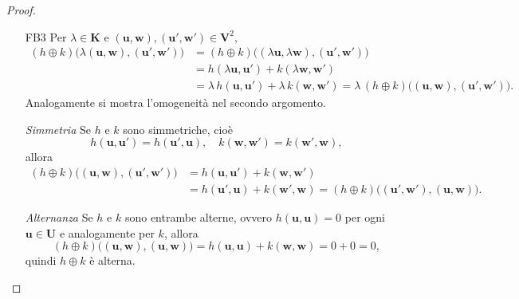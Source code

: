 \documentclass{article}
\theoremstyle{plain}
\theoremstyle{definition}
\theoremstyle{remark}
\begin{document}
\begin{proof}
\begin{itemize}
        \item[FB3]  Per \(\lambda\in \mathbf{K}\) e \((\mathbf{u},\mathbf{w}),(\mathbf{u}',\mathbf{w}')\in \mathbf{V}^2\),
        \[
        \begin{aligned}
        (h\oplus k)\bigl(\lambda(\mathbf{u},\mathbf{w}),(\mathbf{u}',\mathbf{w}')\bigr)
        &= (h\oplus k)\bigl((\lambda\mathbf{u},\lambda\mathbf{w}),(\mathbf{u}',\mathbf{w}')\bigr)\\
        &= h(\lambda\mathbf{u},\mathbf{u}') + k(\lambda\mathbf{w},\mathbf{w}')\\
        &= \lambda\,h(\mathbf{u},\mathbf{u}') + \lambda\,k(\mathbf{w},\mathbf{w}')
        = \lambda\,(h\oplus k)\bigl((\mathbf{u},\mathbf{w}),(\mathbf{u}',\mathbf{w}')\bigr).
        \end{aligned}
        \]
        Analogamente si mostra l'omogeneità nel secondo argomento.

        \item[\textit{Simmetria}] Se \(h\) e \(k\) sono simmetriche, cioè
        \[
        h(\mathbf{u},\mathbf{u}') = h(\mathbf{u}',\mathbf{u}),\quad
        k(\mathbf{w},\mathbf{w}') = k(\mathbf{w}',\mathbf{w}),
        \]
        allora
        \[
        \begin{aligned}
        (h\oplus k)\bigl((\mathbf{u},\mathbf{w}),(\mathbf{u}',\mathbf{w}')\bigr)
        &= h(\mathbf{u},\mathbf{u}') + k(\mathbf{w},\mathbf{w}')\\
        &= h(\mathbf{u}',\mathbf{u}) + k(\mathbf{w}',\mathbf{w})
        = (h\oplus k)\bigl((\mathbf{u}',\mathbf{w}'),(\mathbf{u},\mathbf{w})\bigr).
        \end{aligned}
        \]

        \item[\textit{Alternanza}] Se \(h\) e \(k\) sono entrambe alterne, ovvero \(h(\mathbf{u},\mathbf{u})=0\) per ogni \(\mathbf{u}\in \mathbf{U}\) e analogamente per \(k\), allora
        \[
        (h\oplus k)\bigl((\mathbf{u},\mathbf{w}),(\mathbf{u},\mathbf{w})\bigr)
        = h(\mathbf{u},\mathbf{u}) + k(\mathbf{w},\mathbf{w}) = 0 + 0 = 0,
        \]
        quindi \(h\oplus k\) è alter­na.
    \end{itemize}
\end{proof}

\vspace{10pt}
\end{document}
